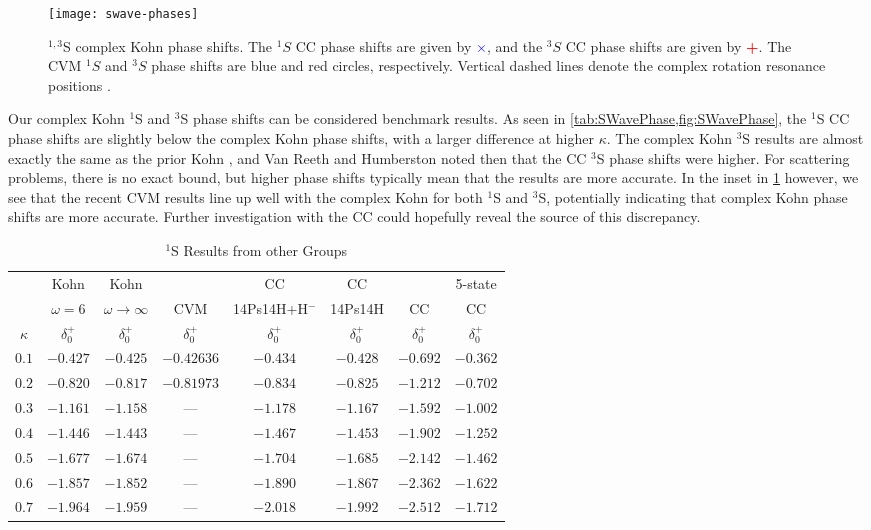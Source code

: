 \documentclass[Dissertation.tex]{subfiles}
\begin{document}
\begin{figure}[H]
	\centering
	\texttt{[image: swave-phases]}
	\caption[$^{1,3}$S complex Kohn phase shifts]{$^{1,3}$S complex Kohn phase shifts. The $^1S$ CC phase shifts
\cite{Walters2004} are given by \mbox{\textcolor{blue}{$\times$}}, and the
$^3S$ CC phase shifts \cite{Blackwood2002} are given by
\mbox{\textcolor{red}{\textbf{+}}}. The CVM $^1S$ and $^3S$ phase shifts
\cite{Zhang2012} are blue and red circles,
respectively. Vertical dashed lines denote the complex rotation resonance
positions \cite{Yan1999,Yan1998a,Ho1998}.}
	\label{fig:SWavePhase}
\end{figure}

Our complex Kohn $^1$S and $^3$S phase shifts can be considered benchmark results. As seen in \cref{tab:SWavePhase,fig:SWavePhase}, the $^1$S CC phase shifts are slightly below the complex Kohn phase shifts, with a larger difference at higher $\kappa$. The complex Kohn $^3$S results are almost exactly the same as the prior Kohn \cite{VanReeth2003}, and Van Reeth and Humberston noted then that the CC $^3$S phase shifts were higher. For scattering problems, there is no exact bound, but higher phase shifts typically mean that the results are more accurate. In the inset in \cref{fig:SWavePhase} however, we see that the recent CVM results line up well with the complex Kohn for both $^1$S and $^3$S, potentially indicating that complex Kohn phase shifts are more accurate. Further investigation with the CC could hopefully reveal the source of this discrepancy.


\begin{table}[H]
\centering
\begin{tabular}{c c c c c c c c}
\toprule
 & Kohn & Kohn & & CC & CC & & 5-state \\
 & $\omega = 6$ & $\omega \rightarrow \infty$ & CVM & 14Ps14H+H$^-$ & 14Ps14H & CC & CC \\
$\kappa$ & $\delta_0^+$ \cite{VanReeth2003} & $\delta_0^+$ \cite{VanReeth2003} & $\delta_0^+$ \cite{Zhang2012} & $\delta_0^+$ \cite{Blackwood2002} & $\delta_0^+$ \cite{Walters2004} & $\delta_0^+$ \cite{Ray1997} & $\delta_0^+$ \cite{Adhikari1999} \\
\midrule
$0.1$ & $-0.427$ & $-0.425$ & $-0.42636$ & $-0.434$ & $-0.428$ & $-0.692$ & $-0.362$ \\
$0.2$ & $-0.820$ & $-0.817$ & $-0.81973$ & $-0.834$ & $-0.825$ & $-1.212$ & $-0.702$ \\
$0.3$ & $-1.161$ & $-1.158$ &    ---     & $-1.178$ & $-1.167$ & $-1.592$ & $-1.002$ \\
$0.4$ & $-1.446$ & $-1.443$ &    ---     & $-1.467$ & $-1.453$ & $-1.902$ & $-1.252$ \\
$0.5$ & $-1.677$ & $-1.674$ &    ---     & $-1.704$ & $-1.685$ & $-2.142$ & $-1.462$ \\
$0.6$ & $-1.857$ & $-1.852$ &    ---     & $-1.890$ & $-1.867$ & $-2.362$ & $-1.622$ \\
$0.7$ & $-1.964$ & $-1.959$ &    ---     & $-2.018$ & $-1.992$ & $-2.512$ & $-1.712$ \\
\bottomrule
\end{tabular}
\caption{$^1$S Results from other Groups}
\label{tab:SWaveSingletOther}
\end{table}
\end{document}
